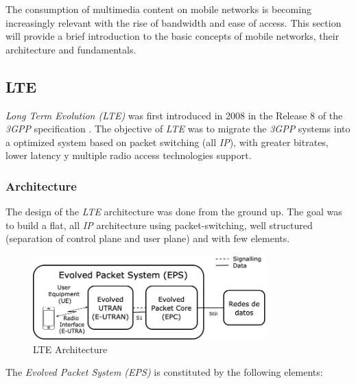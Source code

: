 The consumption of multimedia content on mobile networks is becoming increasingly relevant with 
the rise of bandwidth and ease of access. This section will provide a brief introduction to the 
basic concepts of mobile networks, their architecture and fundamentals.

\subsection{LTE}
\label{sec:4g}

\textit{Long Term Evolution (LTE)} was first introduced in 2008 in the Release 8 of the \textit{3GPP}
specification \cite{lte1}. The objective of \textit{LTE} was to migrate the \textit{3GPP} systems
into a optimized system based on packet switching (all \textit{IP}), with greater bitrates, lower
latency y multiple radio access technologies support.

\subsubsection{Architecture}
\label{sec:eps}

The design of the \textit{LTE} architecture was done from the ground up. The goal was to build a flat, all
\textit{IP} architecture using packet-switching, well structured (separation of control plane and user plane)
and with few elements.

\begin{figure}[h]
  \centering
  \includegraphics[width=0.8\textwidth]{img/eps.png}
  \caption{LTE Architecture}
  \label{fig:eps}
\end{figure}

The \textit{Evolved Packet System (EPS)} is constituted by the following elements:

